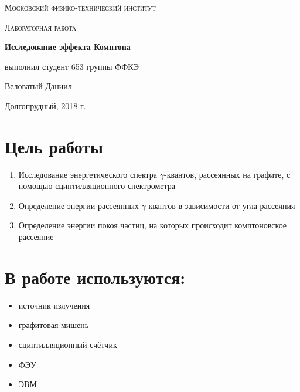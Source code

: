 \documentclass[a4paper]{article}
\begin{document}
\begin{titlepage}
	\centering
	\vspace{5cm}
	{\scshape\LARGE Московский физико-технический институт \par}
	\vspace{4cm}
	{\scshape\Large Лабораторная работа \par}
	\vspace{1cm}
	{\huge\bfseries Исследование эффекта Комптона \par}
	\vspace{1cm}
	\vfill
\begin{flushright}
	{\large выполнил студент 653 группы ФФКЭ}\par
	\vspace{0.3cm}
	{\LARGE Веловатый Даниил} \par


\end{flushright}
	

	\vfill

	Долгопрудный, 2018 г.
\end{titlepage}

\section{Цель работы}
\begin{enumerate}
    \item Исследование энергетического спектра $\gamma$-квантов, рассеянных на графите, с помощью сцинтилляционного спектрометра
    \item Определение энергии рассеянных $\gamma$-квантов в зависимости от угла рассеяния
    \item Определение энергии покоя частиц, на которых происходит комптоновское рассеяние
\end{enumerate}

\section{В работе используются:}
\begin{itemize}
    \item источник излучения
    \item графитовая мишень
    \item сцинтилляционный счётчик
    \item ФЭУ
    \item ЭВМ
\end{itemize}
\end{document}
